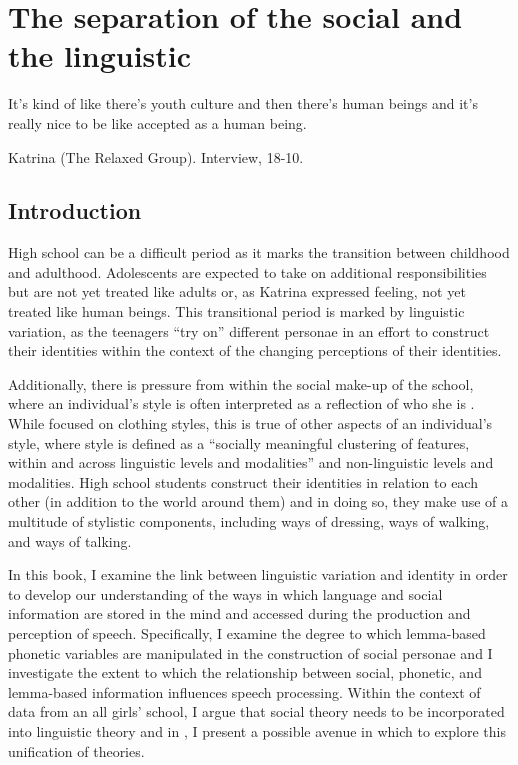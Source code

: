 \chapter{The separation of the social and the linguistic}
\label{ch:litrev}

\epigraph{It's kind of like there's youth culture and then there's human beings and it's really nice to be like accepted as a human being.}{Katrina (The Relaxed Group). Interview, 18-10.}


\section{Introduction}

High school can be a difficult period as it marks the transition between childhood and adulthood. Adolescents are expected to take on additional responsibilities but are not yet treated like adults or, as Katrina expressed feeling, not yet treated like human beings. This transitional period is marked by linguistic variation, as the teenagers ``try on'' different personae in an effort to construct their identities within the context of the changing perceptions of their identities.

Additionally, there is pressure from within the social make-up of the school, where an individual's style is often interpreted as a reflection of who she is \citep[2]{pomerantz2008}. While \citet{pomerantz2008} focused on clothing styles, this is true of other aspects of an individual's style, where style is defined as a ``socially meaningful clustering of features, within and across linguistic levels and modalities'' \citep{campbellkibleretal2006} and non-linguistic levels and modalities. High school students construct their identities in relation to each other (in addition to the world around them) and in doing so, they make use of a multitude of stylistic components, including ways of dressing, ways of walking, and ways of talking. 

In this book, I examine the link between linguistic variation and identity in order to develop our understanding of the ways in which language and social information are stored in the mind and accessed during the production and perception of speech. Specifically, I examine the degree to which lemma-based phonetic variables are manipulated in the construction of social personae and I investigate the extent to which the relationship between social, phonetic, and lemma-based information influences speech processing. Within the context of data from an all girls' school, I argue that social theory needs to be incorporated into linguistic theory and in , I present a possible avenue in which to explore this unification of theories.

